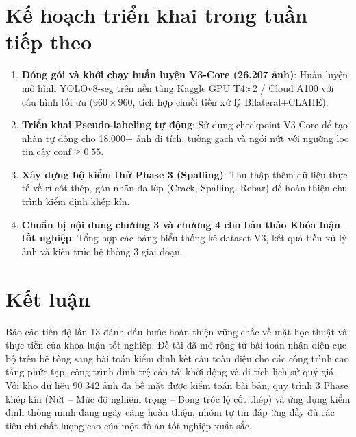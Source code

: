 \documentclass[12pt,a4paper]{article}
\begin{document}
\section{Kế hoạch triển khai trong tuần tiếp theo}
\begin{enumerate}[leftmargin=*]
    \item \textbf{Đóng gói và khởi chạy huấn luyện V3-Core (26.207 ảnh)}: Huấn luyện mô hình YOLOv8-seg trên nền tảng Kaggle GPU T4$\times$2 / Cloud A100 với cấu hình tối ưu ($960\times960$, tích hợp chuỗi tiền xử lý Bilateral+CLAHE).
    \item \textbf{Triển khai Pseudo-labeling tự động}: Sử dụng checkpoint V3-Core để tạo nhãn tự động cho 18.000+ ảnh di tích, tường gạch và ngói nứt với ngưỡng lọc tin cậy $\text{conf} \geq 0.55$.
    \item \textbf{Xây dựng bộ kiểm thử Phase 3 (Spalling)}: Thu thập thêm dữ liệu thực tế về rỉ cốt thép, gán nhãn đa lớp (Crack, Spalling, Rebar) để hoàn thiện chu trình kiểm định khép kín.
    \item \textbf{Chuẩn bị nội dung chương 3 và chương 4 cho bản thảo Khóa luận tốt nghiệp}: Tổng hợp các bảng biểu thống kê dataset V3, kết quả tiền xử lý ảnh và kiến trúc hệ thống 3 giai đoạn.
\end{enumerate}

\section{Kết luận}
Báo cáo tiến độ lần 13 đánh dấu bước hoàn thiện vững chắc về mặt học thuật và thực tiễn của khóa luận tốt nghiệp. Đề tài đã mở rộng từ bài toán nhận diện cục bộ trên bê tông sang bài toán kiểm định kết cấu toàn diện cho các công trình cao tầng phức tạp, công trình đình trệ cần tái khởi động và di tích lịch sử quý giá. Với kho dữ liệu 90.342 ảnh đa bề mặt được kiểm toán bài bản, quy trình 3 Phase khép kín (Nứt -- Mức độ nghiêm trọng -- Bong tróc lộ cốt thép) và ứng dụng kiểm định thông minh đang ngày càng hoàn thiện, nhóm tự tin đáp ứng đầy đủ các tiêu chí chất lượng cao của một đồ án tốt nghiệp xuất sắc.
\end{document}

